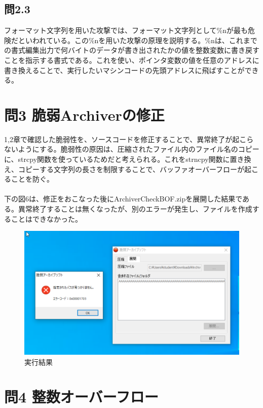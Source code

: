 \documentclass[dvipdfmx,autodetect-engine,titlepage]{jsarticle}
\begin{document}
\subsection{問2.3}
フォーマット文字列を用いた攻撃では、フォーマット文字列として\%nが最も危険だといわれている。この\%nを用いた攻撃の原理を説明する。\%nは、これまでの書式編集出力で何バイトのデータが書き出されたかの値を整数変数に書き戻すことを指示する書式である。これを使い、ポインタ変数の値を任意のアドレスに書き換えることで、実行したいマシンコードの先頭アドレスに飛ばすことができる。\\

\section{問3 脆弱Archiverの修正}
1,2章で確認した脆弱性を、ソースコードを修正することで、異常終了が起こらないようにする。脆弱性の原因は、圧縮されたファイル内のファイル名のコピーに、strcpy関数を使っているためだと考えられる。これをstrncpy関数に置き換え、コピーする文字列の長さを制限することで、バッファオーバーフローが起こることを防ぐ。\\\\
下の図6は、修正をおこなった後にArchiverCheckBOF.zipを展開した結果である。異常終了することは無くなったが、別のエラーが発生し、ファイルを作成することはできなかった。\\
\begin{figure}[H]
  \centering
  \includegraphics[scale=0.6]{fg8.png}
  \caption{実行結果}\label{fig:図8}
\end{figure}



\section{問4 整数オーバーフロー}
\end{document}
